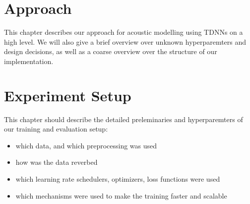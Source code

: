 


\chapter{Approach}
\label{ch:approach}
This chapter describes our approach for acoustic modelling using TDNNs on a high level. 
We will also give a brief overview over unknown hyperparemters and design decisions,
as well as a coarse overview over the structure of our implementation. 

\chapter{Experiment Setup}
\label{ch:experiment_setup}
This chapter should describe the detailed preleminaries and hyperparemters of our training and evaluation setup:
\begin{itemize}
    \item which data, and which preprocessing was used
    \item how was the data reverbed
    \item which learning rate schedulers, optimizers, loss functions were used
    \item which mechanisms were used to make the training faster and scalable
\end{itemize}
